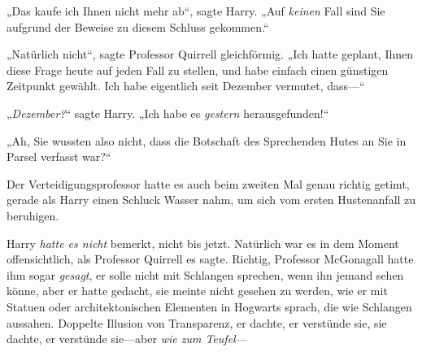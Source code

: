 „Das kaufe ich Ihnen nicht mehr ab“, sagte Harry. „Auf \emph{keinen} Fall sind Sie aufgrund der Beweise zu diesem Schluss gekommen.“

„Natürlich nicht“, sagte Professor Quirrell gleichförmig. „Ich hatte geplant, Ihnen diese Frage heute auf jeden Fall zu stellen, und habe einfach einen günstigen Zeitpunkt gewählt. Ich habe eigentlich seit Dezember vermutet, dass—“

„\emph{Dezember?}“ sagte Harry. „Ich habe es \emph{gestern} herausgefunden!“

„Ah, Sie wussten also nicht, dass die Botschaft des Sprechenden Hutes an Sie in Parsel verfasst war?“

Der Verteidigungsprofessor hatte es auch beim zweiten Mal genau richtig getimt, gerade als Harry einen Schluck Wasser nahm, um sich vom ersten Hustenanfall zu beruhigen.

Harry \emph{hatte es nicht} bemerkt, nicht bis jetzt. Natürlich war es in dem Moment offensichtlich, als Professor Quirrell es sagte. Richtig, Professor McGonagall hatte ihm sogar \emph{gesagt}, er solle nicht mit Schlangen sprechen, wenn ihn jemand sehen könne, aber er hatte gedacht, sie meinte nicht gesehen zu werden, wie er mit Statuen oder architektonischen Elementen in Hogwarts sprach, die wie Schlangen aussahen. Doppelte Illusion von Transparenz, er dachte, er verstünde sie, sie dachte, er verstünde sie—aber \emph{wie zum Teufel}—

